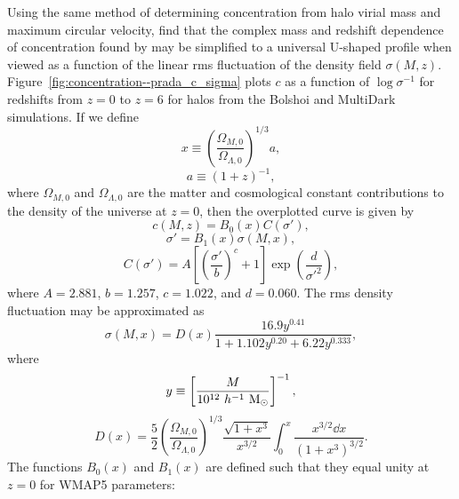 Using the same method of determining concentration from halo virial mass and maximum circular velocity, \citet{2012MNRAS.423.3018P} find that the complex mass and redshift dependence of concentration found by \citet{2011ApJ...740..102K} may be simplified to a universal U-shaped profile when viewed as a function of the linear rms fluctuation of the density field $\sigma(M,z)$.  Figure~\ref{fig:concentration--prada_c_sigma} plots $c$ as a function of $\log \sigma^{-1}$ for redshifts from $z = 0$ to $z = 6$ for halos from the Bolshoi \citep{2011ApJ...740..102K} and MultiDark \citep{2012MNRAS.423.3018P} simulations.  If we define
\begin{equation}
	x \equiv \left( \frac{\Omega_{M,0}}{\Omega_{\Lambda,0}} \right)^{1/3} a,
\end{equation}
\begin{equation}
	a \equiv (1 + z)^{-1},
\end{equation}
where $\Omega_{M,0}$ and $\Omega_{\Lambda,0}$ are the matter and cosmological constant contributions to the density of the universe at $z = 0$, then the overplotted curve is given by
\begin{equation} \label{eq:early_universe--prada_universal_sigma}
	c(M,z) = B_{0}(x)C(\sigma'),
\end{equation}
\begin{equation}
	\sigma' = B_{1}(x) \sigma(M,x),
\end{equation}
\begin{equation} \label{eq:early_universe--prada_universal_sigma_scaled}
	C(\sigma') = A \left[ \left( \frac{\sigma'}{b} \right)^{c} + 1 \right] \exp\left( \frac{d}{\sigma'^{2}} \right),
\end{equation}
where $A = 2.881$, $b = 1.257$, $c = 1.022$, and $d = 0.060$.  The rms density fluctuation may be approximated as
\begin{equation}
	\sigma(M,x) = D(x) \frac{16.9 y^{0.41}}{1 + 1.102 y^{0.20} + 6.22 y^{0.333}},
\end{equation}
where
\begin{equation}
	y \equiv \left[ \frac{M}{10^{12}\ h^{-1}\ \Msun} \right]^{-1},
\end{equation}
\begin{equation}
	D(x) = \frac{5}{2} \left( \frac{\Omega_{M,0}}{\Omega_{\Lambda,0}} \right)^{1/3} \frac{\sqrt{1 + x^{3}}}{x^{3/2}} \int_{0}^{x} \frac{x^{3/2} \dd x}{(1 + x^{3})^{3/2}}.
\end{equation}
The functions $B_{0}(x)$ and $B_{1}(x)$ are defined such that they equal unity at $z = 0$ for WMAP5 parameters:
